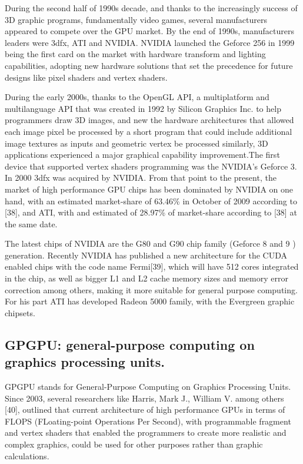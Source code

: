 \documentclass[thesis=M,english]{FITthesis}[2011/07/15]
\begin{document}
During the second half of 1990s decade, and thanks to the increasingly success of 3D graphic programs, fundamentally video games, several manufacturers appeared to compete over the GPU market. By the end of 1990s, manufacturers leaders were 3dfx, ATI and NVIDIA. NVIDIA launched the Geforce 256 in 1999 being the first card on the market with hardware transform and lighting capabilities, adopting new hardware solutions that set the precedence for future designs like pixel shaders and vertex shaders. 

During the early 2000s, thanks to the OpenGL API, a multiplatform and multilanguage API that was created in 1992 by Silicon Graphics Inc. to help programmers draw 3D images, and new the hardware architectures that allowed each image pixel be processed by a short program that could include additional image textures as inputs and geometric vertex be processed similarly, 3D applications experienced a major graphical capability improvement.The first device that supported vertex shaders programming was the NVIDIA’s Geforce 3. In 2000 3dfx was acquired by NVIDIA. From that point to the present, the market of high performance GPU chips has been dominated by NVIDIA on one hand, with an estimated market-share of 63.46\% in October of 2009 according to [38], and ATI, with and estimated of 28.97\% of market-share according to [38] at the same date. 

The latest chips of NVIDIA are the G80 and G90 chip family (Geforce 8 and 9 ) generation. Recently NVIDIA has published a new architecture for the CUDA enabled chips with the code name Fermi[39], which will have 512 cores integrated in the chip, as well as bigger L1 and L2 cache memory sizes and memory error correction among others, making it more suitable for general purpose computing. For his part ATI has developed Radeon 5000 family, with the Evergreen graphic chipsets.

\subsection{GPGPU: general-purpose computing on graphics processing units.}
GPGPU stands for General-Purpose Computing on Graphics Processing Units. Since 2003, several researchers like Harris, Mark J., William V. among others [40], outlined that current architecture of high performance GPUs in terms of FLOPS (FLoating-point Operations Per Second), with programmable fragment and vertex shaders that enabled the programmers to create more realistic and complex graphics, could be used for other purposes rather than graphic calculations.
\end{document}
